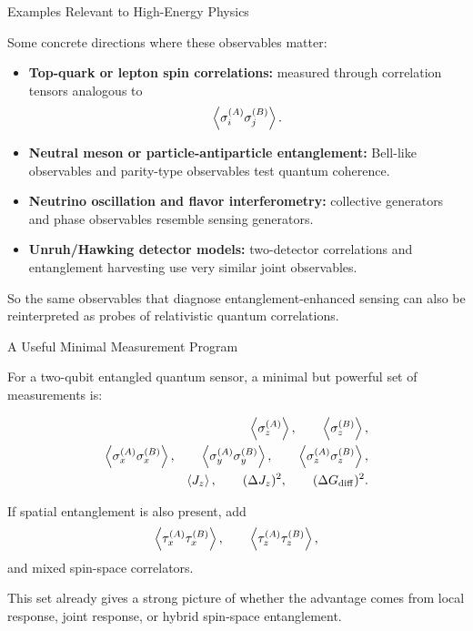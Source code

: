 \documentclass{beamer}
\begin{document}
\begin{frame}{Examples Relevant to High-Energy Physics}

Some concrete directions where these observables matter:

\begin{itemize}
    \item \textbf{Top-quark or lepton spin correlations:}
    measured through correlation tensors analogous to
    \[
    \expval{\sigma_i^{(A)}\sigma_j^{(B)}}.
    \]

    \item \textbf{Neutral meson or particle-antiparticle entanglement:}
    Bell-like observables and parity-type observables test quantum coherence.

    \item \textbf{Neutrino oscillation and flavor interferometry:}
    collective generators and phase observables resemble sensing generators.

    \item \textbf{Unruh/Hawking detector models:}
    two-detector correlations and entanglement harvesting use very similar
    joint observables.
\end{itemize}

So the same observables that diagnose entanglement-enhanced sensing can also be
reinterpreted as probes of relativistic quantum correlations.

\end{frame}

\begin{frame}{A Useful Minimal Measurement Program}

For a two-qubit entangled quantum sensor, a minimal but powerful set of measurements is:

\begin{align}
\expval{\sigma_z^{(A)}}, \qquad
\expval{\sigma_z^{(B)}}, \\
\expval{\sigma_x^{(A)}\sigma_x^{(B)}}, \qquad
\expval{\sigma_y^{(A)}\sigma_y^{(B)}}, \qquad
\expval{\sigma_z^{(A)}\sigma_z^{(B)}}, \\
\expval{J_z}, \qquad
(\Delta J_z)^2, \qquad
(\Delta G_{\mathrm{diff}})^2.
\end{align}

If spatial entanglement is also present, add
\[
\expval{\tau_x^{(A)}\tau_x^{(B)}},\qquad
\expval{\tau_z^{(A)}\tau_z^{(B)}},
\]
and mixed spin-space correlators.

This set already gives a strong picture of whether the advantage comes from
local response, joint response, or hybrid spin-space entanglement.

\end{frame}
\end{document}
